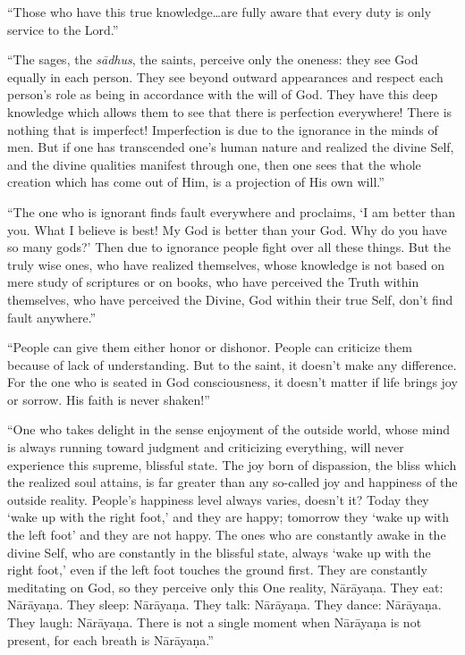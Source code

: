 \documentclass[12pt, twoside, openright]{memoir}
\begin{document}
\enquote{Those who have this true knowledge\ldots are fully aware that every duty is only service to the Lord.}

\enquote{The sages, the \textit{sādhus}, the saints, perceive only the oneness: they see God equally in each person. They see beyond outward appearances and respect each person’s role as being in accordance with the will of God. They have this deep knowledge which allows them to see that there is perfection everywhere! There is nothing that is imperfect! Imperfection is due to the ignorance in the minds of men. But if one has transcended one’s human nature and realized the divine Self, and the divine qualities manifest through one, then one sees that the whole creation which has come out of Him, is a projection of His own will.}

\enquote{The one who is ignorant finds fault everywhere and proclaims, \enquote{I am better than you. What I believe is best! My God is better than your God. Why do you have so many gods?} Then due to ignorance people fight over all these things. But the truly wise ones, who have realized themselves, whose knowledge is not based on mere study of scriptures or on books, who have perceived the Truth within themselves, who have perceived the Divine, God within their true Self, don’t find fault anywhere.}

\enquote{People can give them either honor or dishonor. People can criticize them because of lack of understanding. But to the saint, it doesn’t make any difference. For the one who is seated in God consciousness, it doesn’t matter if life brings joy or sorrow. His faith is never shaken!}

\enquote{One who takes delight in the sense enjoyment of the outside world, whose mind is always running toward judgment and criticizing everything, will never experience this supreme, blissful state. The joy born of dispassion, the bliss which the realized soul attains, is far greater than any so-called joy and happiness of the outside reality. People’s happiness level always varies, doesn’t it? Today they \enquote{wake up with the right foot,} and they are happy; tomorrow they \enquote{wake up with the left foot} and they are not happy. The ones who are constantly awake in the divine Self, who are constantly in the blissful state, always \enquote{wake up with the right foot,} even if the left foot touches the ground first. They are constantly meditating on God, so they perceive only this One reality, Nārāyaṇa. They eat: Nārāyaṇa. They sleep: Nārāyaṇa. They talk: Nārāyaṇa. They dance: Nārāyaṇa. They laugh: Nārāyaṇa. There is not a single moment when Nārāyaṇa is not present, for each breath is Nārāyaṇa.}
\end{document}
